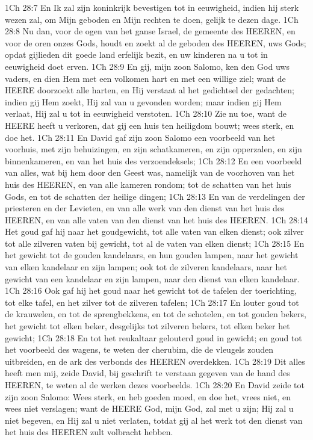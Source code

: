 1Ch 28:7  En Ik zal zijn koninkrijk bevestigen tot in eeuwigheid, indien hij sterk wezen zal, om Mijn geboden en Mijn rechten te doen, gelijk te dezen dage.
1Ch 28:8  Nu dan, voor de ogen van het ganse Israel, de gemeente des HEEREN, en voor de oren onzes Gods, houdt en zoekt al de geboden des HEEREN, uws Gods; opdat gijlieden dit goede land erfelijk bezit, en uw kinderen na u tot in eeuwigheid doet erven.
1Ch 28:9  En gij, mijn zoon Salomo, ken den God uws vaders, en dien Hem met een volkomen hart en met een willige ziel; want de HEERE doorzoekt alle harten, en Hij verstaat al het gedichtsel der gedachten; indien gij Hem zoekt, Hij zal van u gevonden worden; maar indien gij Hem verlaat, Hij zal u tot in eeuwigheid verstoten.
1Ch 28:10  Zie nu toe, want de HEERE heeft u verkoren, dat gij een huis ten heiligdom bouwt; wees sterk, en doe het.
1Ch 28:11  En David gaf zijn zoon Salomo een voorbeeld van het voorhuis, met zijn behuizingen, en zijn schatkameren, en zijn opperzalen, en zijn binnenkameren, en van het huis des verzoendeksels;
1Ch 28:12  En een voorbeeld van alles, wat bij hem door den Geest was, namelijk van de voorhoven van het huis des HEEREN, en van alle kameren rondom; tot de schatten van het huis Gods, en tot de schatten der heilige dingen;
1Ch 28:13  En van de verdelingen der priesteren en der Levieten, en van alle werk van den dienst van het huis des HEEREN, en van alle vaten van den dienst van het huis des HEEREN.
1Ch 28:14  Het goud gaf hij naar het goudgewicht, tot alle vaten van elken dienst; ook zilver tot alle zilveren vaten bij gewicht, tot al de vaten van elken dienst;
1Ch 28:15  En het gewicht tot de gouden kandelaars, en hun gouden lampen, naar het gewicht van elken kandelaar en zijn lampen; ook tot de zilveren kandelaars, naar het gewicht van een kandelaar en zijn lampen, naar den dienst van elken kandelaar.
1Ch 28:16  Ook gaf hij het goud naar het gewicht tot de tafelen der toerichting, tot elke tafel, en het zilver tot de zilveren tafelen;
1Ch 28:17  En louter goud tot de krauwelen, en tot de sprengbekkens, en tot de schotelen, en tot gouden bekers, het gewicht tot elken beker, desgelijks tot zilveren bekers, tot elken beker het gewicht;
1Ch 28:18  En tot het reukaltaar gelouterd goud in gewicht; en goud tot het voorbeeld des wagens, te weten der cherubim, die de vleugels zouden uitbreiden, en de ark des verbonds des HEEREN overdekken.
1Ch 28:19  Dit alles heeft men mij, zeide David, bij geschrift te verstaan gegeven van de hand des HEEREN, te weten al de werken dezes voorbeelds.
1Ch 28:20  En David zeide tot zijn zoon Salomo: Wees sterk, en heb goeden moed, en doe het, vrees niet, en wees niet verslagen; want de HEERE God, mijn God, zal met u zijn; Hij zal u niet begeven, en Hij zal u niet verlaten, totdat gij al het werk tot den dienst van het huis des HEEREN zult volbracht hebben.
